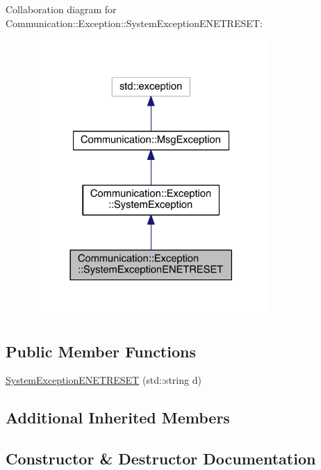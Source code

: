 Collaboration diagram for Communication\+:\+:Exception\+:\+:System\+Exception\+E\+N\+E\+T\+R\+E\+S\+E\+T\+:\nopagebreak
\begin{figure}[H]
\begin{center}
\leavevmode
\includegraphics[width=254pt]{class_communication_1_1_exception_1_1_system_exception_e_n_e_t_r_e_s_e_t__coll__graph}
\end{center}
\end{figure}
\subsection*{Public Member Functions}
\begin{DoxyCompactItemize}
\item 
\hyperlink{class_communication_1_1_exception_1_1_system_exception_e_n_e_t_r_e_s_e_t_a27e976f83fea093422f4225ee63aaca5}{System\+Exception\+E\+N\+E\+T\+R\+E\+S\+E\+T} (std\+::string d)
\end{DoxyCompactItemize}
\subsection*{Additional Inherited Members}


\subsection{Constructor \& Destructor Documentation}
\hypertarget{class_communication_1_1_exception_1_1_system_exception_e_n_e_t_r_e_s_e_t_a27e976f83fea093422f4225ee63aaca5}{}
